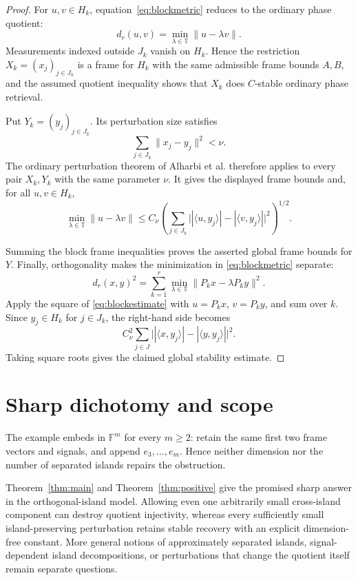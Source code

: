 \documentclass[11pt]{article}
\newcommand{\F}{\mathbb F}
\newcommand{\T}{\mathbb T}
\begin{document}
\begin{proof}
For $u,v\in H_k$, equation~\eqref{eq:blockmetric} reduces to the ordinary
phase quotient:
\[
 d_r(u,v)=\min_{\lambda\in\T}\|u-\lambda v\|.
\]
Measurements indexed outside $J_k$ vanish on $H_k$. Hence the restriction
$X_k=(x_j)_{j\in J_k}$ is a frame for $H_k$ with the same admissible frame
bounds $A,B$, and the assumed quotient inequality shows that $X_k$ does
$C$-stable ordinary phase retrieval.

Put $Y_k=(y_j)_{j\in J_k}$. Its perturbation size satisfies
\[
 \sum_{j\in J_k}\|x_j-y_j\|^2<\nu.
\]
The ordinary perturbation theorem of Alharbi et al. therefore applies to
every pair $X_k,Y_k$ with the same parameter $\nu$. It gives the displayed
frame bounds and, for all $u,v\in H_k$,
\begin{equation}\label{eq:blockestimate}
 \min_{\lambda\in\T}\|u-\lambda v\|
 \leq C_\nu\left(\sum_{j\in J_k}
 \big||\langle u,y_j\rangle|-|\langle v,y_j\rangle|\big|^2\right)^{1/2}.
\end{equation}

Summing the block frame inequalities proves the asserted global frame bounds
for $Y$. Finally, orthogonality makes the minimization in
\eqref{eq:blockmetric} separate:
\[
 d_r(x,y)^2=\sum_{k=1}^r
 \min_{\lambda\in\T}\|P_kx-\lambda P_ky\|^2.
\]
Apply the square of \eqref{eq:blockestimate} with
$u=P_kx$, $v=P_ky$, and sum over $k$. Since $y_j\in H_k$ for $j\in J_k$,
the right-hand side becomes
\[
 C_\nu^2\sum_{j\in J}
 \big||\langle x,y_j\rangle|-|\langle y,y_j\rangle|\big|^2.
\]
Taking square roots gives the claimed global stability estimate.
\end{proof}

\section{Sharp dichotomy and scope}

The example embeds in $\F^m$ for every $m\ge2$: retain the same first two
frame vectors and signals, and append $e_3,\dots,e_m$. Hence neither dimension
nor the number of separated islands repairs the obstruction.

Theorem~\ref{thm:main} and Theorem~\ref{thm:positive} give the promised sharp
answer in the orthogonal-island model. Allowing even one arbitrarily small
cross-island component can destroy quotient injectivity, whereas every
sufficiently small island-preserving perturbation retains stable recovery with
an explicit dimension-free constant. More general notions of approximately
separated islands, signal-dependent island decompositions, or perturbations
that change the quotient itself remain separate questions.
\end{document}
